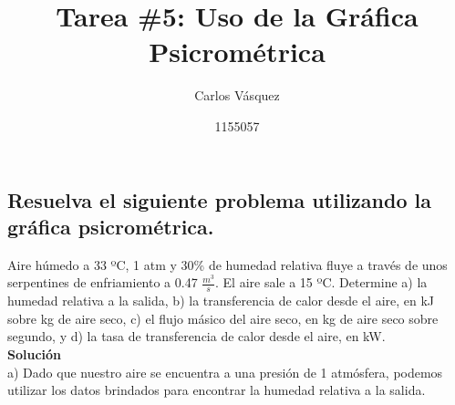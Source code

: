 \documentclass[12pt, letterpaper]{article}
\title{Tarea \#5: Uso de la Gráfica Psicrométrica}
\author{Carlos Vásquez \and 1155057}
\begin{document}
\maketitle
\subsection*{Resuelva el siguiente problema utilizando la gráfica psicrométrica.}
Aire húmedo a 33 ºC, 1 atm y 30\% de humedad relativa fluye a través de unos serpentines de enfriamiento a 0.47 $\frac{m^3}{s}$. El aire sale a 15 ºC. Determine a) la humedad relativa a la salida, b) la transferencia de calor desde el aire, en kJ sobre kg de aire seco, c) el flujo másico del aire seco, en kg de aire seco sobre segundo, y d) la tasa de transferencia de calor desde el aire, en kW.\\
\textbf{Solución}\\
a) Dado que nuestro aire se encuentra a una presión de 1 atmósfera, podemos utilizar los datos brindados para encontrar la humedad relativa a la salida.
\end{document}
